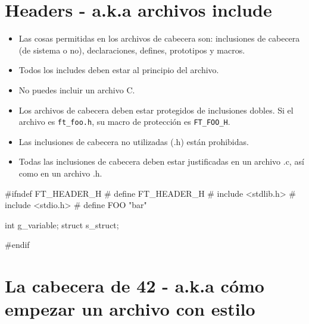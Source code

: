 \documentclass{42-es}
\begin{document}
\section{Headers - a.k.a archivos include}

\begin{itemize}
      \item Las cosas permitidas en los archivos de cabecera son:
            inclusiones de cabecera (de sistema o no), declaraciones, defines,
            prototipos y macros.
      \item Todos los includes deben estar al principio del archivo.
      \item No puedes incluir un archivo C.
      \item Los archivos de cabecera deben estar protegidos de inclusiones
            dobles. Si el archivo es \texttt{ft\_foo.h}, su macro de protección
            es
            \texttt{FT\_FOO\_H}.
      \item Las inclusiones de cabecera no utilizadas (.h) están prohibidas.
      \item Todas las inclusiones de cabecera deben estar justificadas en un
            archivo .c, así como en un archivo .h.
\end{itemize}

\begin{42ccode}
      #ifndef FT_HEADER_H
      # define FT_HEADER_H
      # include <stdlib.h>
      # include <stdio.h>
      # define FOO "bar"

      int	g_variable;
      struct	s_struct;

      #endif
\end{42ccode}
\newpage


\section{La cabecera de 42 - a.k.a cómo empezar un archivo con estilo}
\end{document}
